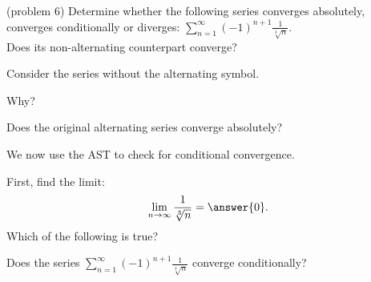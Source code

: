 \documentclass[handout]{ximera}
\begin{document}
\begin{problem}(problem 6)
Determine whether the following series converges absolutely, converges conditionally or diverges: $\displaystyle{\sum_{n=1}^\infty (-1)^{n+1} \frac{1}{\sqrt[3] n}}$.\\
Does its non-alternating counterpart converge?
\begin{hint} 
Consider the series without the alternating symbol.
\end{hint}
\begin{multipleChoice}
\end{multipleChoice}

Why?
\begin{multipleChoice}
\end{multipleChoice}




Does the original alternating series converge absolutely?
\begin{multipleChoice}
\end{multipleChoice}

We now use the AST to check for conditional convergence.

First, find the limit:
\[
\lim_{n\to\infty} \frac{1}{\sqrt[3] n} = \answer{0}.
\]
Which of the following is true?
\begin{multipleChoice}
\end{multipleChoice}


Does the series $\displaystyle{\sum_{n=1}^\infty (-1)^{n+1} \frac{1}{\sqrt[3] n}}$ converge conditionally?
\begin{multipleChoice}
\end{multipleChoice}

\end{problem}
\end{document}
